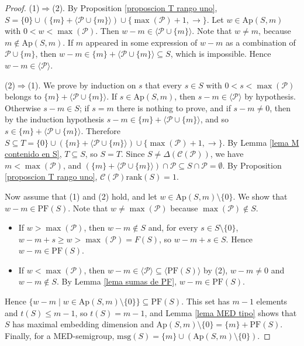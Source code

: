 \documentclass[11pt]{article}
\numberwithin{equation}{section}
\newcommand{\CP}{\mathcal C(\mathcal P)}
\newcommand{\rk}{\mathrm{rank}}
\newcommand{\Ap}{\mathrm{Ap}}
\newcommand{\PF}{\mathrm{PF}}
\newcommand{\msg}{\mathrm{msg}}
\begin{document}
\begin{proof}
(1)$\Rightarrow$(2). By Proposition \ref{proposcion T rango uno}, $S=\{0\}\cup(\{m\}+\langle\mathcal P\cup\{m\}\rangle)\cup\{\max(\mathcal P)+1,\rightarrow\}$. Let $w\in\Ap(S,m)$ with $0<w<\max(\mathcal P)$. Then $w-m\in\langle\mathcal P\cup\{m\}\rangle$. Note that $w\neq m$, because $m\notin\Ap(S,m)$. If $m$ appeared in some expression of $w-m$ as a combination of $\mathcal P\cup\{m\}$, then $w-m\in\{m\}+\langle\mathcal P\cup\{m\}\rangle\subseteq S$, which is impossible. Hence $w-m\in\langle\mathcal P\rangle$.

(2)$\Rightarrow$(1). We prove by induction on $s$ that every $s\in S$ with $0<s<\max(\mathcal P)$ belongs to $\{m\}+\langle\mathcal P\cup\{m\}\rangle$. If $s\in\Ap(S,m)$, then $s-m\in\langle\mathcal P\rangle$ by hypothesis. Otherwise $s-m\in S$; if $s=m$ there is nothing to prove, and if $s-m\neq0$, then by the induction hypothesis $s-m\in\{m\}+\langle\mathcal P\cup\{m\}\rangle$, and so $s\in\{m\}+\langle\mathcal P\cup\{m\}\rangle$. Therefore $S\subseteq T=\{0\}\cup(\{m\}+\langle\mathcal P\cup\{m\}\rangle)\cup\{\max(\mathcal P)+1,\rightarrow\}$. By Lemma \ref{lema M contenido en S}, $T\subseteq S$, so $S=T$. Since $S\neq\Delta(\CP)$, we have $m<\max(\mathcal P)$, and $(\{m\}+\langle\mathcal P\cup\{m\}\rangle)\cap\mathcal P\subseteq S\cap\mathcal P=\emptyset$. By Proposition \ref{proposcion T rango uno}, $\CP\rk(S)=1$.

Now assume that (1) and (2) hold, and let $w\in\Ap(S,m)\setminus\{0\}$. We show that $w-m\in\PF(S)$. Note that $w\neq\max(\mathcal P)$ because $\max(\mathcal P)\notin S$.
\begin{itemize}
\item If $w>\max(\mathcal P)$, then $w-m\notin S$ and, for every $s\in S\setminus\{0\}$, $w-m+s\geq w>\max(\mathcal P)=F(S)$, so $w-m+s\in S$. Hence $w-m\in\PF(S)$.
\item If $w<\max(\mathcal P)$, then $w-m\in\langle\mathcal P\rangle\subseteq\langle\PF(S)\rangle$ by (2), $w-m\neq0$ and $w-m\notin S$. By Lemma \ref{lema sumas de PF}, $w-m\in\PF(S)$.
\end{itemize}
Hence $\{w-m\mid w\in\Ap(S,m)\setminus\{0\}\}\subseteq\PF(S)$. This set has $m-1$ elements and $t(S)\leq m-1$, so $t(S)=m-1$, and Lemma \ref{lema MED tipo} shows that $S$ has maximal embedding dimension and $\Ap(S,m)\setminus\{0\}=\{m\}+\PF(S)$. Finally, for a MED-semigroup, $\msg(S)=\{m\}\cup(\Ap(S,m)\setminus\{0\})$.
\end{proof}
\end{document}
